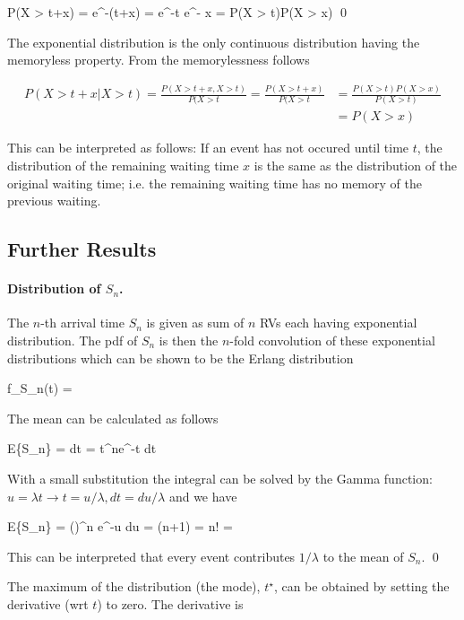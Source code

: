 \bee
P(X > t+x) = e^{-\lambda (t+x)} = e^{-\lambda t} e^{- \lambda x} = P(X > t)P(X > x) \qed
\eee

The exponential distribution is the only continuous distribution having the memoryless property. From the memorylessness follows

\begin{align*}
P(X>t+x|X>t) = \frac{P(X>t+x, X>t)}{P(X>t} = \frac{P(X>t+x)}{P(X>t} &= \frac{P(X>t)P(X>x)}{P(X>t)} \\ &= P(X>x)
\end{align*}

This can be interpreted as follows: If an event has not occured until time $t$, the distribution of the remaining waiting time $x$ is the same as the distribution of the original waiting time; i.e. the remaining waiting time has no memory of the previous waiting.

\subsection{Further Results}

\paragraph{Distribution of $S_n$.} The $n$-th arrival time $S_n$ is given as sum of $n$ RVs each having exponential distribution. The pdf of $S_n$ is then the $n$-fold convolution of these exponential distributions which can be shown to be the Erlang distribution

\bee
f_{S_n}(t) = 
\eee

The mean can be calculated as follows

\bee
E\{S_n\} = \int {} dt =  \int t^{n}e^{-\lambda t} dt
\eee

With a small substitution the integral can be solved by the Gamma function: $u=\lambda t \rightarrow t=u/\lambda, dt = du/\lambda$ and we have

\bee
E\{S_n\} =   \int \left(\right)^n e^{-u} du =  \Gamma(n+1) =  n! = 
\eee

This can be interpreted that every event contributes $1/\lambda$ to the mean of $S_n$. \qed

The maximum of the distribution (the mode), $t^\star$, can be obtained by setting the derivative (wrt $t$) to zero. The derivative is

